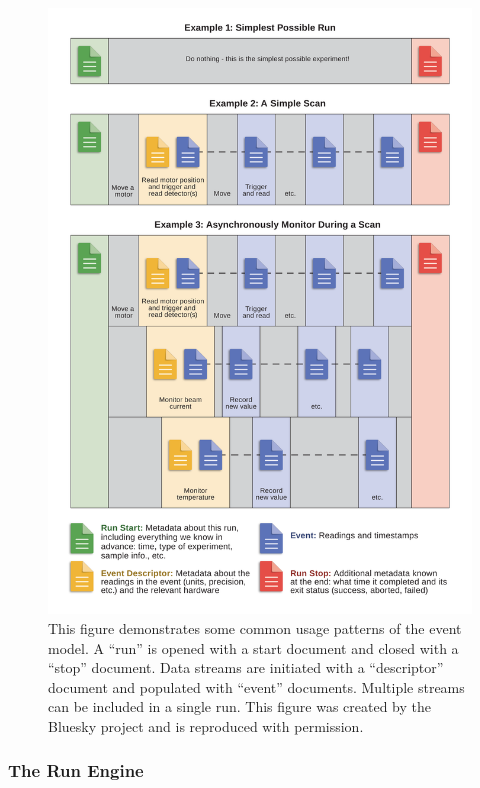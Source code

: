 \begin{figure}
\includegraphics[width=5.5in]{"acquisition/images/event_model"}
\caption[The Event Model]{
This figure demonstrates some common usage patterns of the event model.
A ``run'' is opened with a start document and closed with a ``stop'' document.
Data streams are initiated with a ``descriptor'' document and populated with ``event'' documents.
Multiple streams can be included in a single run.
This figure was created by the Bluesky project and is reproduced with permission.
}
\label{acq:fig:event_model}
\end{figure}



\subsubsection{The Run Engine}

